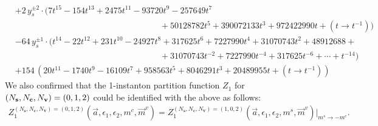 \documentclass[letterpaper, 11pt]{article}
\newcommand{\nn}{\nonumber}
\def\e{\epsilon}
\begin{document}
{\begin{align}
  &+2\,y_s^{\pm2}\cdot (7 t^{15}-154 t^{13}+2475 t^{11}-93720 t^9-257649 t^7 \nn\\
  &\qquad\qquad\qquad\qquad\qquad\qquad\qquad\qquad\quad +50128782 t^5+390072133 t^3+972422990t+ (t\rightarrow t^{-1}))\nn\\
  &-64\,y_s^{\pm1}\cdot (t^{14}-22 t^{12}+231 t^{10}-24927 t^8+317625 t^6+7227990 t^4+31070743t^2+48912688+ \nn\\
  &\qquad\qquad\qquad\qquad\qquad\qquad\qquad\qquad\quad +31070743t^{-2}+7227990 t^{-4}+317625 t^{-6}+ \cdots + t^{-14})\nn\\
  &+154\,(20 t^{11}-1740 t^9-16109 t^7+958563 t^5+8046291 t^3+20489955
  t+ (t\rightarrow t^{-1}))
  \end{align}
  We also confirmed that the 1-instanton partition function $Z_1$ for $(N_{\bf s},N_{\bf c}, N_{\bf v}) = (0,1,2)$ could be identified with the above as follows:
  \begin{align}
    {Z}_{1}^{(N_{\mathbf{s}},N_\mathbf{c},N_{\mathbf{v}}) = (0,1,2)}(\vec{a},\e_1,\e_2,m^c,\vec{m}^v)  = {Z}_{1}^{(N_{\mathbf{s}},N_\mathbf{c},N_{\mathbf{v}}) = (1,0,2)}(\vec{a},\e_1,\e_2,m^s,\vec{m}^v) |_{m^s \rightarrow -m^c }.
  \end{align}
  

}
\end{document}
